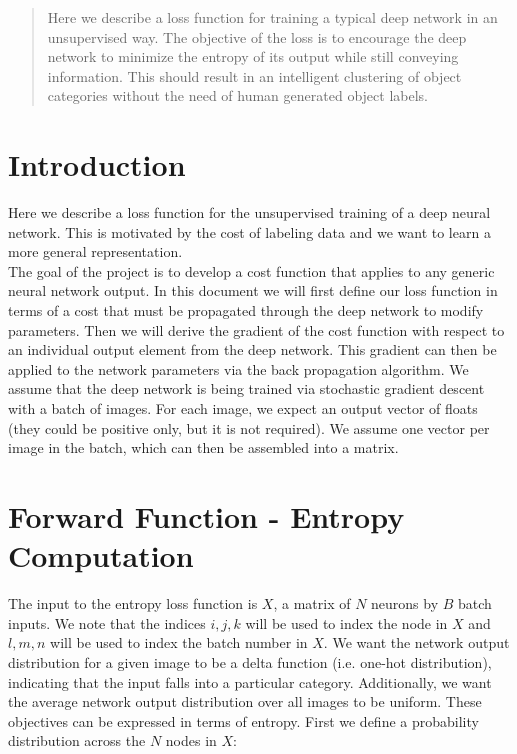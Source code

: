 \begin{abstract}
Here we describe a loss function for training a typical deep network in an unsupervised way. The objective of the loss is to encourage the deep network to minimize the entropy of its output while still conveying information. This should result in an intelligent clustering of object categories without the need of human generated object labels.
\end{abstract}

\section{Introduction} \label{introduction}
\noindent Here we describe a loss function for the unsupervised training of a deep neural network. This is motivated by the cost of labeling data and we want to learn a more general representation.\\

\noindent The goal of the project is to develop a cost function that applies to any generic neural network output. In this document we will first define our loss function in terms of a cost that must be propagated through the deep network to modify parameters. Then we will derive the gradient of the cost function with respect to an individual output element from the deep network. This gradient can then be applied to the network parameters via the back propagation algorithm. We assume that the deep network is being trained via stochastic gradient descent with a batch of images. For each image, we expect an output vector of floats (they could be positive only, but it is not required). We assume one  vector per image in the batch, which can then be assembled into a matrix.

\section{Forward Function - Entropy Computation} \label{forward}
\noindent The input to the entropy loss function is $X$, a matrix of $N$ neurons by $B$ batch inputs. We note that the indices $i, j, k$ will be used to index the node in $X$ and $l,m,n$ will be used to index the batch number in $X$. We want the network output distribution for a given image to be a delta function (i.e. one-hot distribution), indicating that the input falls into a particular category. Additionally, we want the average network output distribution over all images to be uniform. These objectives can be expressed in terms of entropy. First we define a probability distribution across the $N$ nodes in $X$:

